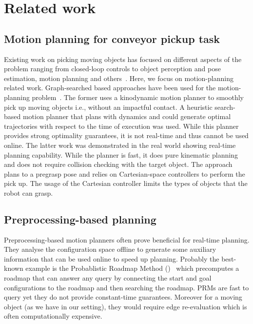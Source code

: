 \documentclass[conference]{IEEEtran}
\begin{document}
\section{Related work}
\subsection{Motion planning for conveyor pickup task}
Existing work on picking moving objects has focused on different aspects of the problem ranging from closed-loop controls to object perception and pose estimation, motion planning and others~\cite{allen1993automated, han2019toward, stogl2017tracking, zhang2018gilbreth}. 
%
Here, we focus on motion-planning related work. Graph-searched based approaches have been used for the motion-planning problem~\cite{cowley2013perception, menon2014motion}. The former uses a kinodynamic motion planner to smoothly pick up moving objects i.e., without an impactful contact. A heuristic search-based motion planner that plans with dynamics and could generate optimal trajectories with respect to the time of execution was used. While this planner provides strong optimality guarantees, it is not real-time and thus cannot be used online.
%
The latter work was demonstrated in the real world showing real-time planning capability. While the planner is fast, it does  pure kinematic planning and does not require collision checking with the target object. The approach plans to a pregrasp pose and relies on Cartesian-space controllers to perform the pick up. The usage of the Cartesian controller limits the types of objects that the robot can grasp.


\subsection{Preprocessing-based planning}
Preprocessing-based motion planners often prove beneficial for real-time planning. They analyse the configuration space offline to generate some auxiliary information that can be used online to speed up planning. 
Probably the best-known example is the Probablistic Roadmap Method ()~\cite{kavraki1996probabilistic} which precomputes a roadmap that can answer any query by connecting the start and goal configurations to the roadmap and then searching the roadmap. \textsf{PRM}s are fast to query yet they do not provide constant-time guarantees.
Moreover for a moving object (as we have in our setting), they would require edge re-evaluation which is often computationally expensive.
%
\end{document}
